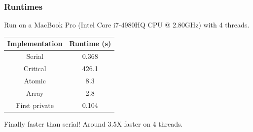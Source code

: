 \documentclass[aspectratio=169]{beamer}
\begin{document}
\begin{frame}
\frametitle{Runtimes}
Run on a MacBook Pro (Intel Core i7-4980HQ CPU @ 2.80GHz) with 4 threads.

\vfill

\begin{table}
\begin{tabular}{cc}
\toprule
Implementation & Runtime (s) \\
\midrule
Serial        & 0.368 \\
Critical      & 426.1 \\
Atomic        & 8.3 \\
Array         & 2.8 \\
First private & 0.104 \\
\bottomrule
\end{tabular}
\end{table}


\begin{center}
\large Finally faster than serial! Around 3.5X faster on 4 threads.
\end{center}

\end{frame}

\end{document}
